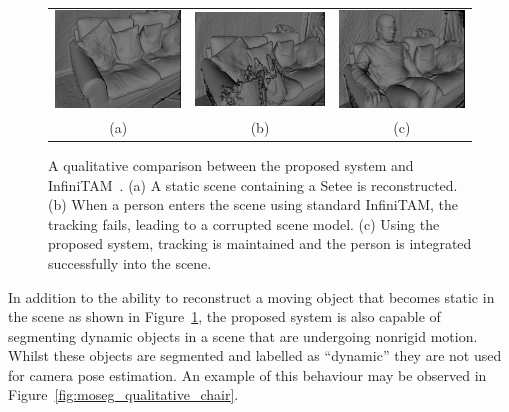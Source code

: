 \begin{figure}[!htbp]
~\label{fig:moseg_qualitative_setee}
  \centering
  \begin{tabular}{ccc}
    \includegraphics[height=.2\linewidth]{figures/moseg/original_sitting.png} &
    \includegraphics[height=.2\linewidth]{figures/moseg/infinitam_sitting.png} &
    \includegraphics[height=.2\linewidth]{figures/moseg/moseg_sitting.png}\\
    (a) & (b) & (c)
  \end{tabular}
  \caption[Motion Segmentation Qualitative Results I]
  {A qualitative comparison between the proposed system and InfiniTAM~\cite{Prisacariu2014}.
    (a) A static scene containing a Setee is reconstructed.
    (b) When a person enters the scene using standard InfiniTAM, the tracking
    fails, leading to a corrupted scene model.
    (c) Using the proposed system, tracking is maintained and the person is
    integrated successfully into the scene.}
\end{figure}

In addition to the ability to reconstruct a moving object that becomes static in
the scene as shown in Figure~\ref{fig:moseg_qualitative_setee}, the proposed
system is also capable of segmenting dynamic objects in a scene that are
undergoing nonrigid motion. Whilst these objects are segmented and labelled as
``dynamic'' they are not used for camera pose estimation. An example of this
behaviour may be observed in Figure~\ref{fig:moseg_qualitative_chair}.

